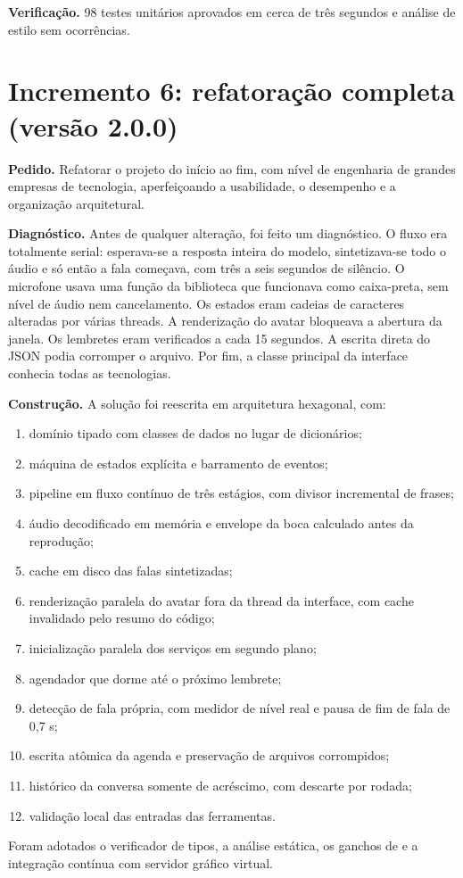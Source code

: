 \textbf{Verificação.} 98 testes unitários aprovados em cerca de três segundos e análise de estilo sem
ocorrências.

\section{Incremento 6: refatoração completa (versão 2.0.0)}

\textbf{Pedido.} Refatorar o projeto do início ao fim, com nível de engenharia de grandes empresas de
tecnologia, aperfeiçoando a usabilidade, o desempenho e a organização arquitetural.

\textbf{Diagnóstico.} Antes de qualquer alteração, foi feito um diagnóstico. O fluxo era totalmente
serial: esperava-se a resposta inteira do modelo, sintetizava-se todo o áudio e só então a fala começava,
com três a seis segundos de silêncio. O microfone usava uma função da biblioteca que funcionava como
caixa-preta, sem nível de áudio nem cancelamento. Os estados eram cadeias de caracteres alteradas por
várias threads. A renderização do avatar bloqueava a abertura da janela. Os lembretes eram verificados
a cada 15 segundos. A escrita direta do JSON podia corromper o arquivo. Por fim, a classe principal da
interface conhecia todas as tecnologias.

\textbf{Construção.} A solução foi reescrita em arquitetura hexagonal, com:
\begin{enumerate}[label=\alph*)]
  \item domínio tipado com classes de dados no lugar de dicionários;
  \item máquina de estados explícita e barramento de eventos;
  \item pipeline em fluxo contínuo de três estágios, com divisor incremental de frases;
  \item áudio decodificado em memória e envelope da boca calculado antes da reprodução;
  \item cache em disco das falas sintetizadas;
  \item renderização paralela do avatar fora da thread da interface, com cache invalidado pelo resumo do
        código;
  \item inicialização paralela dos serviços em segundo plano;
  \item agendador que dorme até o próximo lembrete;
  \item detecção de fala própria, com medidor de nível real e pausa de fim de fala de 0,7 s;
  \item escrita atômica da agenda e preservação de arquivos corrompidos;
  \item histórico da conversa somente de acréscimo, com descarte por rodada;
  \item validação local das entradas das ferramentas.
\end{enumerate}
Foram adotados o verificador de tipos, a análise estática, os ganchos de  e a integração
contínua com servidor gráfico virtual.

